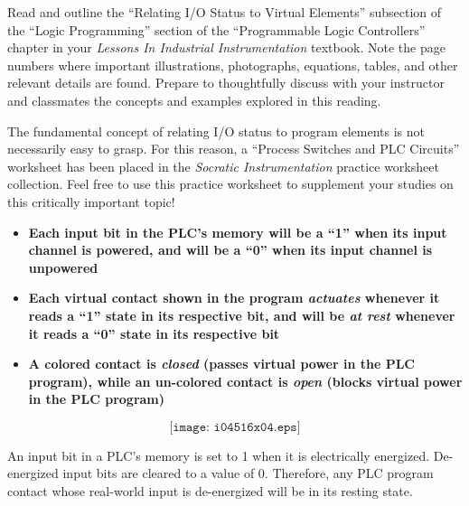 

Read and outline the ``Relating I/O Status to Virtual Elements'' subsection of the ``Logic Programming'' section of the ``Programmable Logic Controllers'' chapter in your {\it Lessons In Industrial Instrumentation} textbook.  Note the page numbers where important illustrations, photographs, equations, tables, and other relevant details are found.  Prepare to thoughtfully discuss with your instructor and classmates the concepts and examples explored in this reading.

\vskip 10pt

The fundamental concept of relating I/O status to program elements is not necessarily easy to grasp.  For this reason, a ``Process Switches and PLC Circuits'' worksheet has been placed in the {\it Socratic Instrumentation} practice worksheet collection.  Feel free to use this practice worksheet to supplement your studies on this critically important topic!















\begin{itemize}
\item{} {\bf Each input bit in the PLC's memory will be a ``1'' when its input channel is powered, and will be a ``0'' when its input channel is unpowered}
\vskip 5pt
\item{} {\bf Each virtual contact shown in the program {\it actuates} whenever it reads a ``1'' state in its respective bit, and will be {\it at rest} whenever it reads a ``0'' state in its respective bit}
\vskip 5pt
\item{} {\bf A colored contact is {\it closed} (passes virtual power in the PLC program), while an un-colored contact is {\it open} (blocks virtual power in the PLC program)}
\end{itemize}

$$\texttt{[image: i04516x04.eps]}$$

An input bit in a PLC's memory is set to 1 when it is electrically energized.  De-energized input bits are cleared to a value of 0.  Therefore, any PLC program contact whose real-world input is de-energized will be in its resting state.

